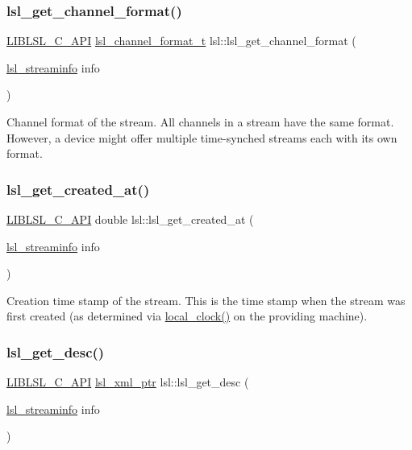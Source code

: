 \subsubsection{\texorpdfstring{lsl\+\_\+get\+\_\+channel\+\_\+format()}{lsl\_get\_channel\_format()}}
{\footnotesize\ttfamily \hyperlink{lsl__cpp_8h_aafd0ef1813e8be84a1420c4f1df64615}{L\+I\+B\+L\+S\+L\+\_\+\+C\+\_\+\+A\+PI} \hyperlink{namespacelsl_af188e978739868560b53dbf0ddd58e66}{lsl\+\_\+channel\+\_\+format\+\_\+t} lsl\+::lsl\+\_\+get\+\_\+channel\+\_\+format (\begin{DoxyParamCaption}\item[{\hyperlink{namespacelsl_aa0a9ce9956061679949daa2e35aae2e8}{lsl\+\_\+streaminfo}}]{info }\end{DoxyParamCaption})}

Channel format of the stream. All channels in a stream have the same format. However, a device might offer multiple time-\/synched streams each with its own format. \mbox{\label{namespacelsl_aded8755dc0f65d8219449ef37ba7f6c5}} 
\subsubsection{\texorpdfstring{lsl\+\_\+get\+\_\+created\+\_\+at()}{lsl\_get\_created\_at()}}
{\footnotesize\ttfamily \hyperlink{lsl__cpp_8h_aafd0ef1813e8be84a1420c4f1df64615}{L\+I\+B\+L\+S\+L\+\_\+\+C\+\_\+\+A\+PI} double lsl\+::lsl\+\_\+get\+\_\+created\+\_\+at (\begin{DoxyParamCaption}\item[{\hyperlink{namespacelsl_aa0a9ce9956061679949daa2e35aae2e8}{lsl\+\_\+streaminfo}}]{info }\end{DoxyParamCaption})}

Creation time stamp of the stream. This is the time stamp when the stream was first created (as determined via \hyperlink{namespacelsl_ae1766ae2ab66141cb927612e57a0c8c6}{local\+\_\+clock()} on the providing machine). \mbox{\label{namespacelsl_aeb428e46e46db8bd534e45ed8a76a120}} 
\subsubsection{\texorpdfstring{lsl\+\_\+get\+\_\+desc()}{lsl\_get\_desc()}}
{\footnotesize\ttfamily \hyperlink{lsl__cpp_8h_aafd0ef1813e8be84a1420c4f1df64615}{L\+I\+B\+L\+S\+L\+\_\+\+C\+\_\+\+A\+PI} \hyperlink{namespacelsl_a5edc7a49a1a1be1634fe6dce3d59c59b}{lsl\+\_\+xml\+\_\+ptr} lsl\+::lsl\+\_\+get\+\_\+desc (\begin{DoxyParamCaption}\item[{\hyperlink{namespacelsl_aa0a9ce9956061679949daa2e35aae2e8}{lsl\+\_\+streaminfo}}]{info }\end{DoxyParamCaption})}

